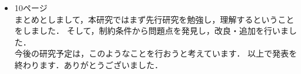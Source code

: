 \documentclass{jsarticle}
\begin{document}
\begin{itemize}
\item 10ページ\\
まとめとしまして，本研究ではまず先行研究を勉強し，理解するということをしました．
そして，制約条件から問題点を発見し，改良・追加を行いました．\\
今後の研究予定は，このようなことを行おうと考えています．
以上で発表を終わります．ありがとうございました．
\fi
\end{itemize}
\end{document}
